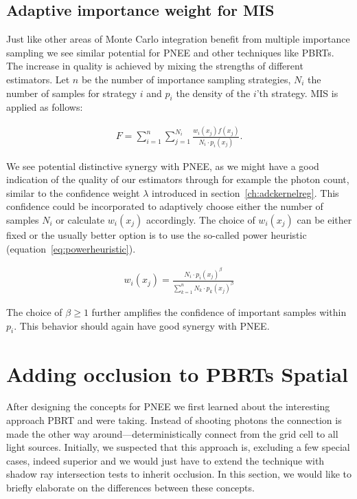 \subsection{Adaptive importance weight for MIS}

Just like other areas of Monte Carlo integration benefit from multiple importance sampling we see similar potential for PNEE and other techniques like PBRTs. The increase in quality is achieved by mixing the strengths of different estimators. Let $n$ be the number of importance sampling strategies, $N_i$ the number of samples for strategy $i$ and $p_i$ the density of the $i$'th strategy. MIS is applied as follows:

\begin{align}
F = \sum_{i=1}^{n}\sum_{j=1}^{N_i}\frac{w_i(x_j)f(x_j)}{N_i \cdot p_i(x_j)}.
\label{eq:mis}
\end{align}

We see potential distinctive synergy with PNEE, as we might have a good indication of the quality of our estimators through for example the photon count, similar to the confidence weight $\lambda$ introduced in section~\ref{ch:adckernelreg}. This confidence could be incorporated to adaptively choose either the number of samples $N_i$ or calculate $w_i(x_j)$ accordingly. The choice of $w_i(x_j)$ can be either fixed or the usually better option is to use the so-called power heuristic (equation~\ref{eq:powerheuristic})\parencite{veach1997robust}. 

\begin{align}
w_i(x_j) = \frac{N_i \cdot p_i(x_j)^\beta}{\sum_{k=1}^{n} N_k \cdot p_k(x_j)^\beta}
\label{eq:powerheuristic}
\end{align}

The choice of $\beta \geq 1$ further amplifies the confidence of important samples within $p_i$. This behavior should again have good synergy with PNEE.


\section{Adding occlusion to PBRTs Spatial}
\label{sec:pbrtoccl}

After designing the concepts for PNEE we first learned about the interesting approach PBRT and \textcite{Vevoda} were taking. Instead of shooting photons the connection is made the other way around---deterministically connect from the grid cell to all light sources. Initially, we suspected that this approach is, excluding a few special cases, indeed superior and we would just have to extend the technique with shadow ray intersection tests to inherit occlusion. In this section, we would like to briefly elaborate on the differences between these concepts.

